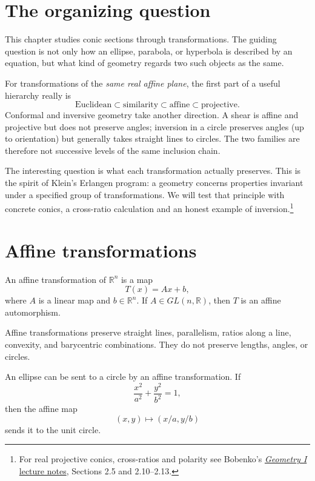 
\section{The organizing question}

This chapter studies conic sections through transformations.  The guiding question is not only how an ellipse, parabola, or hyperbola is described by an equation, but what kind of geometry regards two such objects as the same.

For transformations of the \emph{same real affine plane}, the first part of a useful hierarchy really is
\[
 \mathrm{Euclidean}\subset \mathrm{similarity}\subset
 \mathrm{affine}\subset \mathrm{projective}.
\]
Conformal and inversive geometry take another direction. A shear is affine and projective but does not preserve angles; inversion in a circle preserves angles (up to orientation) but generally takes straight lines to circles. The two families are therefore not successive levels of the same inclusion chain.

The interesting question is what each transformation actually preserves. This is the spirit of Klein's Erlangen program: a geometry concerns properties invariant under a specified group of transformations. We will test that principle with concrete conics, a cross-ratio calculation and an honest example of inversion.\footnote{For real projective conics, cross-ratios and polarity see Bobenko's \href{https://www3.math.tu-berlin.de/geometrie/Lehre/WS16/GeometryI/geometry1-ws16.pdf}{\emph{Geometry I} lecture notes}, Sections 2.5 and 2.10--2.13.}

\section{Affine transformations}

\begin{definition}
An affine transformation of \(\mathbb R^n\) is a map
\[
  T(x)=Ax+b,
\]
where \(A\) is a linear map and \(b\in\mathbb R^n\).  If \(A\in GL(n,\mathbb R)\), then \(T\) is an affine automorphism.
\end{definition}

Affine transformations preserve straight lines, parallelism, ratios along a line, convexity, and barycentric combinations.  They do not preserve lengths, angles, or circles.

\begin{example}
An ellipse can be sent to a circle by an affine transformation.  If
\[
  \frac{x^2}{a^2}+\frac{y^2}{b^2}=1,
\]
then the affine map
\[
  (x,y)\mapsto (x/a,y/b)
\]
sends it to the unit circle.
\end{example}

